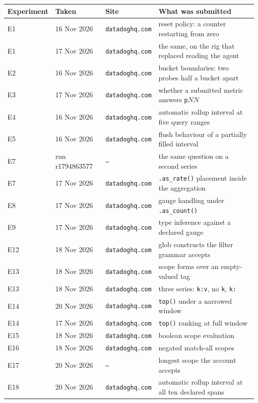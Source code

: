 \begin{tabular}{@{}llll@{}}
\toprule
Experiment & Taken & Site & What was submitted \\
\midrule
E1 & 16 Nov 2026 & \texttt{datadoghq.com} & reset policy: a counter restarting from zero \\
E1 & 17 Nov 2026 & \texttt{datadoghq.com} & the same, on the rig that replaced reading the agent \\
E2 & 16 Nov 2026 & \texttt{datadoghq.com} & bucket boundaries: two probes half a bucket apart \\
E3 & 17 Nov 2026 & \texttt{datadoghq.com} & whether a submitted metric answers \texttt{p}$NN$ \\
E4 & 16 Nov 2026 & \texttt{datadoghq.com} & automatic rollup interval at five query ranges \\
E5 & 16 Nov 2026 & \texttt{datadoghq.com} & flush behaviour of a partially filled interval \\
E7 & run r1794863577 & \texttt{---} & the same question on a second series \\
E7 & 17 Nov 2026 & \texttt{datadoghq.com} & \texttt{.as\_rate()} placement inside the aggregation \\
E8 & 17 Nov 2026 & \texttt{datadoghq.com} & gauge handling under \texttt{.as\_count()} \\
E9 & 17 Nov 2026 & \texttt{datadoghq.com} & type inference against a declared gauge \\
E12 & 18 Nov 2026 & \texttt{datadoghq.com} & glob constructs the filter grammar accepts \\
E13 & 18 Nov 2026 & \texttt{datadoghq.com} & scope forms over an empty-valued tag \\
E13 & 18 Nov 2026 & \texttt{datadoghq.com} & three series: \texttt{k:v}, no \texttt{k}, \texttt{k:} \\
E14 & 20 Nov 2026 & \texttt{datadoghq.com} & \texttt{top()} under a narrowed window \\
E14 & 17 Nov 2026 & \texttt{datadoghq.com} & \texttt{top()} ranking at full window \\
E15 & 18 Nov 2026 & \texttt{datadoghq.com} & boolean scope evaluation \\
E16 & 18 Nov 2026 & \texttt{datadoghq.com} & negated match-all scopes \\
E17 & 20 Nov 2026 & \texttt{---} & longest scope the account accepts \\
E18 & 20 Nov 2026 & \texttt{datadoghq.com} & automatic rollup interval at all ten declared spans \\
\bottomrule
\end{tabular}

